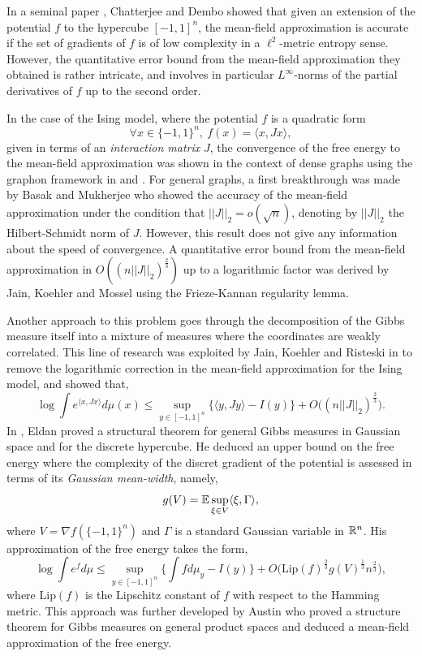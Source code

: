 \documentclass[a4paper,oneside,11pt]{article}
\begin{document}
In a seminal paper \cite{CD}, Chatterjee and Dembo showed that given an extension of the potential $f$ to the hypercube $[-1,1]^n$, the mean-field approximation is accurate if the set of gradients of $f$ is of low complexity in a $\ell^2$-metric entropy sense. However, the quantitative error bound from the mean-field approximation they obtained is rather intricate, and involves in particular $L^{\infty}$-norms of the partial derivatives of $f$ up to the second order.  

In the case of the Ising model, where the potential $f$ is a quadratic form
$$\forall x \in \{-1,1\}^n, \  f(x) = \langle x, J x \rangle,$$
given in terms of an \textit{interaction matrix} $J$, the convergence of the free energy to the mean-field approximation was shown in the context of dense graphs using the graphon framework in \cite{BCLSV} and \cite{BCCZ}. For general graphs,
a first breakthrough was made by Basak and Mukherjee \cite{BM} who showed the accuracy of the mean-field approximation under the condition that $ ||J||_2 = o(\sqrt{n})$, denoting by $||J||_2$ the Hilbert-Schmidt norm of $J$. However, this result does not give any information about the speed of convergence. A quantitative error bound from the mean-field approximation in $O( (n||J||_2)^{\frac{2}{3}})$ up to a logarithmic factor was derived by Jain, Koehler and Mossel \cite{JKM} using the Frieze-Kannan regularity lemma.


Another approach to this problem goes through the decomposition of the Gibbs measure itself into a mixture of measures where the coordinates are weakly correlated. This line of research was exploited by Jain, Koehler and Risteski in \cite{JKR} to remove the logarithmic correction in the mean-field approximation for the Ising model, and showed that,
\begin{equation} \label{JKR} \log \int e^{\langle x, Jx\rangle } d\mu(x) \leq \sup_{y\in[-1,1]^n } \{ \langle y ,Jy \rangle - I(y)\} + O\big( (n ||J||_2)^{\frac{2}{3}}\big).\end{equation}
In \cite{Eldan}, Eldan proved a structural theorem for general Gibbs measures in Gaussian space and for the discrete hypercube. He deduced an upper bound on the free energy where the complexity of the discret gradient of the potential is assessed in terms of its \textit{Gaussian mean-width}, namely,
\begin{equation} \label{Gaussianwidth} g(V) = \mathbb{E} \sup_{\xi \in V} \langle \xi, \Gamma \rangle,\end{equation}
where $V = \nabla f(\{-1,1\}^n)$ and $\Gamma$ is a standard Gaussian variable in $\mathbb{R}^n$. His approximation of the free energy \cite[Corollary 2]{Eldan} takes the form, 
\begin{equation} \label{Eldanmeanfield} \log \int e^f d\mu \leq \sup_{ y\in [-1,1]^n} \big \{ \int f d\mu_y - I(y)\big\} + O\big( \mathrm{Lip}(f)^{\frac{2}{3}} g(V)^{\frac{1}{3}} n^{\frac{2}{3}} \big),\end{equation} 
where $\mathrm{Lip}(f)$ is the Lipschitz constant of $f$ with respect to the Hamming metric. This approach was further developed by Austin \cite{A} who proved a structure theorem for Gibbs measures on general product spaces and deduced a mean-field approximation of the free energy.
\end{document}
